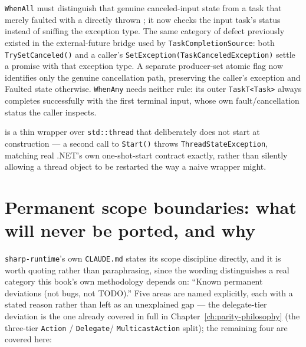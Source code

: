 \texttt{WhenAll} must distinguish that genuine canceled-input state from a task that merely
faulted with a directly thrown ; it now checks the input task's
status instead of sniffing the exception type. The same category of defect previously existed
in the external-future bridge used by \texttt{TaskCompletionSource}: both
\texttt{TrySetCanceled()} and a caller's \texttt{SetException(TaskCanceledException)} settle a
promise with that exception type. A separate producer-set atomic flag now identifies only the
genuine cancellation path, preserving the caller's exception and Faulted state otherwise.
\texttt{WhenAny} needs neither rule: its outer \texttt{TaskT<Task>} always completes successfully
with the first terminal input, whose own fault/cancellation status the caller inspects.

 is a thin wrapper over \texttt{std::thread} that deliberately does
not start at construction --- a second call to \texttt{Start()} throws
\texttt{ThreadStateException}, matching real .NET's own one-shot-start contract exactly,
rather than silently allowing a thread object to be restarted the way a naive wrapper might.

\section{Permanent scope boundaries: what will never be ported, and why}

\texttt{sharp-runtime}'s own \texttt{CLAUDE.md} states its scope discipline directly, and it is
worth quoting rather than paraphrasing, since the wording distinguishes a real category this
book's own methodology depends on: ``Known permanent deviations (not bugs, not TODO).'' Five
areas are named explicitly, each with a stated reason rather than left as an unexplained gap ---
the delegate-tier deviation is the one already covered in full in
Chapter~\ref{ch:parity-philosophy} (the three-tier \texttt{Action} / \texttt{Delegate}/
\texttt{MulticastAction} split); the remaining four are covered here:

